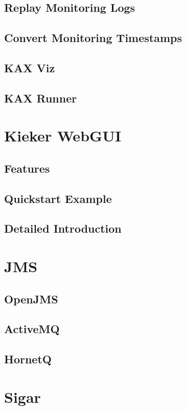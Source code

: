 \documentclass[paper=a4,twoside=false,fontsize=11pt,numbers=noenddot,version=first,bibliography=totoc,headsepline]{scrbook}
\begin{document}
		\section{Replay Monitoring Logs}
		\section{Convert Monitoring Timestamps}
		\section{KAX Viz}
		\section{KAX Runner}
		
	\chapter{Kieker WebGUI}\label{chp:WebGUI}
		\section{Features}
		\section{Quickstart Example}
		\section{Detailed Introduction}
  
	\appendix
		\hypertarget{hypertarget:appendix}{}
	
		\chapter{JMS}
			\section{OpenJMS}
			\section{ActiveMQ}
			\section{HornetQ}
		\chapter{Sigar}



\end{document}
